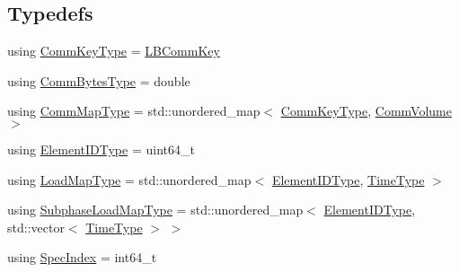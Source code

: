 \subsection*{Typedefs}
\begin{DoxyCompactItemize}
\item 
using \hyperlink{namespacevt_1_1vrt_1_1collection_1_1balance_a01c9a1060d83d052604a3ff12918033a}{Comm\+Key\+Type} = \hyperlink{structvt_1_1vrt_1_1collection_1_1balance_1_1_l_b_comm_key}{L\+B\+Comm\+Key}
\item 
using \hyperlink{namespacevt_1_1vrt_1_1collection_1_1balance_a0772d7dd137393e9874b9f8caa96d420}{Comm\+Bytes\+Type} = double
\item 
using \hyperlink{namespacevt_1_1vrt_1_1collection_1_1balance_a10860c956804d644db54a16012352728}{Comm\+Map\+Type} = std\+::unordered\+\_\+map$<$ \hyperlink{namespacevt_1_1vrt_1_1collection_1_1balance_a01c9a1060d83d052604a3ff12918033a}{Comm\+Key\+Type}, \hyperlink{structvt_1_1vrt_1_1collection_1_1balance_1_1_comm_volume}{Comm\+Volume} $>$
\item 
using \hyperlink{namespacevt_1_1vrt_1_1collection_1_1balance_a14c8d2c972f2913aa3f1636e5be0a120}{Element\+I\+D\+Type} = uint64\+\_\+t
\item 
using \hyperlink{namespacevt_1_1vrt_1_1collection_1_1balance_a45306ee4bf38fe3fb586d1ee2fa3d147}{Load\+Map\+Type} = std\+::unordered\+\_\+map$<$ \hyperlink{namespacevt_1_1vrt_1_1collection_1_1balance_a14c8d2c972f2913aa3f1636e5be0a120}{Element\+I\+D\+Type}, \hyperlink{namespacevt_a876a9d0cd5a952859c72de8a46881442}{Time\+Type} $>$
\item 
using \hyperlink{namespacevt_1_1vrt_1_1collection_1_1balance_a3d91523158c1025b7b665240072f3b7e}{Subphase\+Load\+Map\+Type} = std\+::unordered\+\_\+map$<$ \hyperlink{namespacevt_1_1vrt_1_1collection_1_1balance_a14c8d2c972f2913aa3f1636e5be0a120}{Element\+I\+D\+Type}, std\+::vector$<$ \hyperlink{namespacevt_a876a9d0cd5a952859c72de8a46881442}{Time\+Type} $>$ $>$
\item 
using \hyperlink{namespacevt_1_1vrt_1_1collection_1_1balance_a72a5e0d9936ddf57f8e6c64e0e9fd123}{Spec\+Index} = int64\+\_\+t
\end{DoxyCompactItemize}
